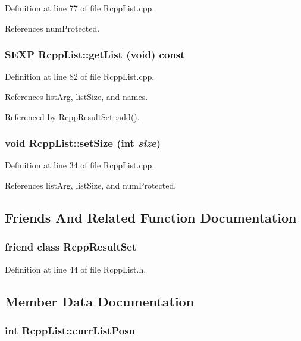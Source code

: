 Definition at line 77 of file RcppList.cpp.

References numProtected.\hypertarget{classRcppList_a0d983805932608efbab2afecfd547ec4}{
\subsubsection[{getList}]{\setlength{\rightskip}{0pt plus 5cm}SEXP RcppList::getList (void) const}}
\label{classRcppList_a0d983805932608efbab2afecfd547ec4}


Definition at line 82 of file RcppList.cpp.

References listArg, listSize, and names.

Referenced by RcppResultSet::add().\hypertarget{classRcppList_aa107c65834057ff79f5f8285ef5b1f3c}{
\subsubsection[{setSize}]{\setlength{\rightskip}{0pt plus 5cm}void RcppList::setSize (int {\em size})}}
\label{classRcppList_aa107c65834057ff79f5f8285ef5b1f3c}


Definition at line 34 of file RcppList.cpp.

References listArg, listSize, and numProtected.

\subsection{Friends And Related Function Documentation}
\hypertarget{classRcppList_a36944d83d40784eedc607fbb24a5e993}{
\subsubsection[{RcppResultSet}]{\setlength{\rightskip}{0pt plus 5cm}friend class {\bf RcppResultSet}}}
\label{classRcppList_a36944d83d40784eedc607fbb24a5e993}


Definition at line 44 of file RcppList.h.

\subsection{Member Data Documentation}
\hypertarget{classRcppList_a4b991902830e9f33eac03a42b2718195}{
\subsubsection[{currListPosn}]{\setlength{\rightskip}{0pt plus 5cm}int {\bf RcppList::currListPosn}}}
\label{classRcppList_a4b991902830e9f33eac03a42b2718195}


